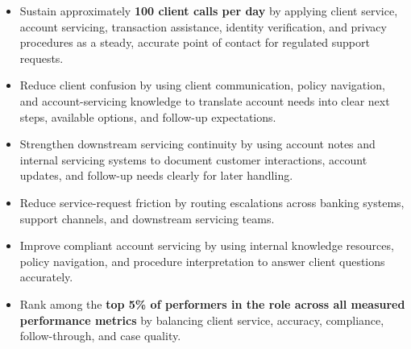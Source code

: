 \par\smallskip
\noindent
\begin{minipage}[t]{20cm}%
  \begin{minipage}[t]{9.75cm}%
    \begin{itemize}
      \item Sustain approximately \textbf{100 client calls per day} by applying client service, account servicing, transaction assistance, identity verification, and privacy procedures as a steady, accurate point of contact for regulated support requests.
      \item Reduce client confusion by using client communication, policy navigation, and account-servicing knowledge to translate account needs into clear next steps, available options, and follow-up expectations.
      \item Strengthen downstream servicing continuity by using account notes and internal servicing systems to document customer interactions, account updates, and follow-up needs clearly for later handling.
    \end{itemize}
  \end{minipage}%
  \hfill%
  \begin{minipage}[t]{9.75cm}%
    \begin{itemize}
      \item Reduce service-request friction by routing escalations across banking systems, support channels, and downstream servicing teams.
      \item Improve compliant account servicing by using internal knowledge resources, policy navigation, and procedure interpretation to answer client questions accurately.
      \item Rank among the \textbf{top 5\% of performers in the role across all measured performance metrics} by balancing client service, accuracy, compliance, follow-through, and case quality.
    \end{itemize}
  \end{minipage}%
\end{minipage}
\divider%

